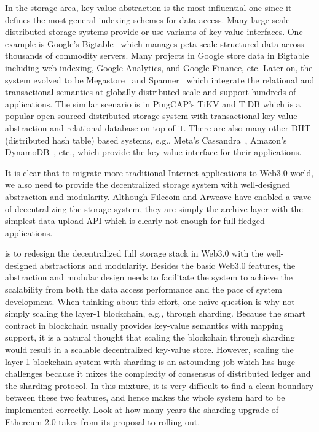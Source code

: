 In the storage area, key-value abstraction is the most influential one since it defines the most general indexing schemes for data access. Many large-scale distributed storage systems provide or use variants of key-value interfaces. One example is Google’s Bigtable~\cite{bigtable} which manages peta-scale structured data across thousands of commodity servers. Many projects in Google store data in Bigtable including web indexing, Google Analytics, and Google Finance, etc. Later on, the system evolved to be Megastore~\cite{megastore} and Spanner~\cite{spanner} which integrate the relational and transactional semantics at globally-distributed scale and support hundreds of applications. The similar scenario is in PingCAP’s TiKV and TiDB which is a popular open-sourced distributed storage system with transactional key-value abstraction and relational database on top of it. There are also many other DHT (distributed hash table) based systems, e.g., Meta’s Cassandra~\cite{cassandra}, Amazon’s DynamoDB~\cite{dynamodb}, etc., which provide the key-value interface for their applications. 

It is clear that to migrate more traditional Internet applications to Web3.0 world, we also need to provide the decentralized storage system with well-designed abstraction and modularity. Although Filecoin and Arweave have enabled a wave of decentralizing the storage system, they are simply the archive layer with the simplest data upload API which is clearly not enough for full-fledged applications.

\project is to redesign the decentralized full storage stack in Web3.0 with the well-designed abstractions and modularity. Besides the basic Web3.0 features, the abstraction and modular design needs to facilitate the system to achieve the scalability from both the data access performance and the pace of system development. When thinking about this effort, one naïve question is why not simply scaling the layer-1 blockchain, e.g., through sharding. Because the smart contract in blockchain usually provides key-value semantics with mapping support, it is a natural thought that scaling the blockchain through sharding would result in a scalable decentralized key-value store. However, scaling the layer-1 blockchain system with sharding is an astounding job which has huge challenges because it mixes the complexity of consensus of distributed ledger and the sharding protocol. In this mixture, it is very difficult to find a clean boundary between these two features, and hence makes the whole system hard to be implemented correctly. Look at how many years the sharding upgrade of Ethereum 2.0 takes from its proposal to rolling out. 

